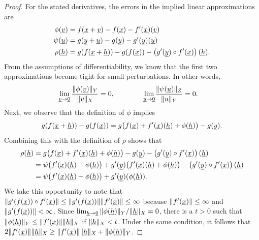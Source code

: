 \begin{proof}
For the stated derivatives, the errors in the implied linear approximations are 
\begin{align*}
\phi(\underline{v}) &= f(\underline{x} + \underline{v})-f(\underline{x}) - f'(\underline{x})(\underline{v}) \\
\psi(\underline{u}) &= g(\underline{y} + \underline{u})-g(\underline{y}) - g'(\underline{y})(\underline{u}) \\
\rho(\underline{h}) &= g(f(\underline{x} + \underline{h})) -g(f(\underline{x})) - \left( g'(\underline{y}) \circ f'(\underline{x})\right) (\underline{h}).
\end{align*}
From the assumptions of differentiability, we know that the first two approximations become tight for small perturbations.
In other words,
\begin{align*}
\lim_{\underline{v} \to \underline{0}} \frac{\| \phi (\underline{v}) \|_Y}{\|\underline{v}\|_X} = 0,  \quad\quad\quad\quad \lim_{\underline{u} \to \underline{0}} & \frac{\| \psi (\underline{u})\|_Z}{\|\underline{u}\|_Y} = 0.
\end{align*}
Next, we observe that the definition of $\phi$ implies
\[ g(f(\underline{x} + \underline{h})) -g(f(\underline{x})) = g \big( f(\underline{x}) + f'(\underline{x})(\underline{h}) + \phi(\underline{h}) \big) - g(\underline{y}). \]
Combining this with the definition of $\rho$ shows that
\begin{align*}
\rho(\underline{h}) &= g \big( f(\underline{x}) + f'(\underline{x})(\underline{h}) + \phi(\underline{h}) \big) - g(\underline{y}) - \left( g'(\underline{y}) \circ f'(\underline{x})\right) (\underline{h}) \\
&= \psi \big(f'(\underline{x})(\underline{h}) + \phi(\underline{h}) \big) + g'(\underline{y})\big( f'(\underline{x})(\underline{h}) + \phi(\underline{h}) \big) - \left( g'(\underline{y}) \circ f'(\underline{x})\right) (\underline{h}) \\
&= \psi \big(f'(\underline{x})(\underline{h}) + \phi(\underline{h}) \big) + g'(\underline{y})(\phi(\underline{h})).
\end{align*}
We take this opportunity to note that $\|g'(f(\underline{x}))\circ f'(\underline{x})\| \leq \|g'(f(\underline{x}))\| \|f'(\underline{x})\| \leq \infty$ because $\|f'(\underline{x})\|\leq \infty$ and $\|g'(f(\underline{x}))\| <\infty$. 
Since $\lim_{\underline{h} \to \underline{0}} \| \phi (\underline{h}) \|_Y / \|\underline{h}\|_X = 0$, there is a $t>0$ such that $\|\phi(\underline{h})\|_Y \leq \|f'(\underline{x})\| \|\underline{h}\|_X$ if $\|\underline{h}\|_X < t$.
Under the same condition, it follows that $2 \|f'(\underline{x})\| \|\underline{h}\|_X \geq \|f'(\underline{x})\| \|\underline{h}\|_X + \| \phi(\underline{h}) \|_Y$. 

\end{proof}
